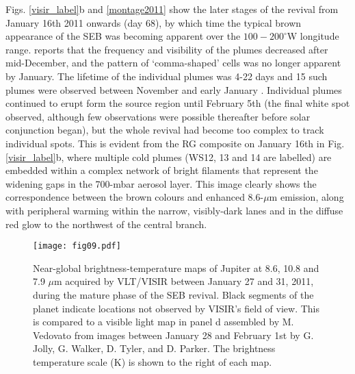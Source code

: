 \documentclass[final,authoryear,5p,times,twocolumn]{elsarticle}
\begin{document}
Figs. \ref{visir_label}b and \ref{montage2011} show the later stages of the revival from January 16th 2011 onwards (day 68), by which time the typical brown appearance of the SEB was becoming apparent over the $100-200^\circ$W longitude range. \citet{11rogers_21} reports that the frequency and visibility of the plumes decreased after mid-December, and the pattern of `comma-shaped' cells was no longer apparent by January.  The lifetime of the individual plumes was 4-22 days and 15 such plumes were observed between November and early January \citep{11rogers_21, 16rogers}.  Individual plumes continued to erupt form the source region until February 5th (the final white spot observed, although few observations were possible thereafter before solar conjunction began), but the whole revival had become too complex to track individual spots.  This is evident from the RG composite on January 16th in Fig. \ref{visir_label}b, where multiple cold plumes (WS12, 13 and 14 are labelled) are embedded within a complex network of bright filaments that represent the widening gaps in the 700-mbar aerosol layer.  This image clearly shows the correspondence between the brown colours and enhanced 8.6-$\mu$m emission, along with peripheral warming within the narrow, visibly-dark lanes and in the diffuse red glow to the northwest of the central branch. 

\begin{figure*}
\begin{centering}
\centerline{\texttt{[image: fig09.pdf]}}
\caption{Near-global brightness-temperature maps of Jupiter at 8.6, 10.8 and 7.9 $\mu$m acquired by VLT/VISIR between January 27 and 31, 2011, during the mature phase of the SEB revival.  Black segments of the planet indicate locations not observed by VISIR's field of view.  This is compared to a visible light map in panel d assembled by M. Vedovato from images between January 28 and February 1st by G. Jolly, G. Walker, D. Tyler, and D. Parker.  The brightness temperature scale (K) is shown to the right of each map.}
\label{cmap2011jan}
\end{centering}
\end{figure*} 
\end{document}
